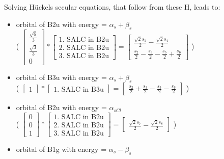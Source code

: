 \documentclass[12pt,a4paper]{article}
\begin{document}
Solving Hückels secular equations, that follow from these H, leads to:
\begin{itemize}
\item orbital of B2u with energy = $\alpha_{s} + \beta_{s}$ \\
                            ( $\left[\begin{matrix}\frac{\sqrt{6}}{3}\\\frac{\sqrt{3}}{3}\\0\end{matrix}\right] * \left[\begin{array}{c}\text{1. SALC in B2u} \\ \text{2. SALC in B2u} \\ \text{3. SALC in B2u}\end{array}\right] = \left[\begin{matrix}\frac{\sqrt{2} s_{1}}{2} - \frac{\sqrt{2} s_{4}}{2}\\\frac{s_{2}}{2} - \frac{s_{3}}{2} - \frac{s_{5}}{2} + \frac{s_{6}}{2}\end{matrix}\right] $ )
\item orbital of B3u with energy = $\alpha_{s} + \beta_{s}$ \\
                            ( $\left[\begin{matrix}1\end{matrix}\right] * \left[\begin{array}{c}\text{1. SALC in B3u}\end{array}\right] = \left[\begin{matrix}\frac{s_{2}}{2} + \frac{s_{3}}{2} - \frac{s_{5}}{2} - \frac{s_{6}}{2}\end{matrix}\right] $ )
\item orbital of B2u with energy = $\alpha_{s Cl}$ \\
                            ( $\left[\begin{matrix}0\\0\\1\end{matrix}\right] * \left[\begin{array}{c}\text{1. SALC in B2u} \\ \text{2. SALC in B2u} \\ \text{3. SALC in B2u}\end{array}\right] = \left[\begin{matrix}\frac{\sqrt{2} s_{7}}{2} - \frac{\sqrt{2} s_{8}}{2}\end{matrix}\right] $ )
\item orbital of B1g with energy = $\alpha_{s} - \beta_{s}$ \\

\end{itemize}
\end{document}
